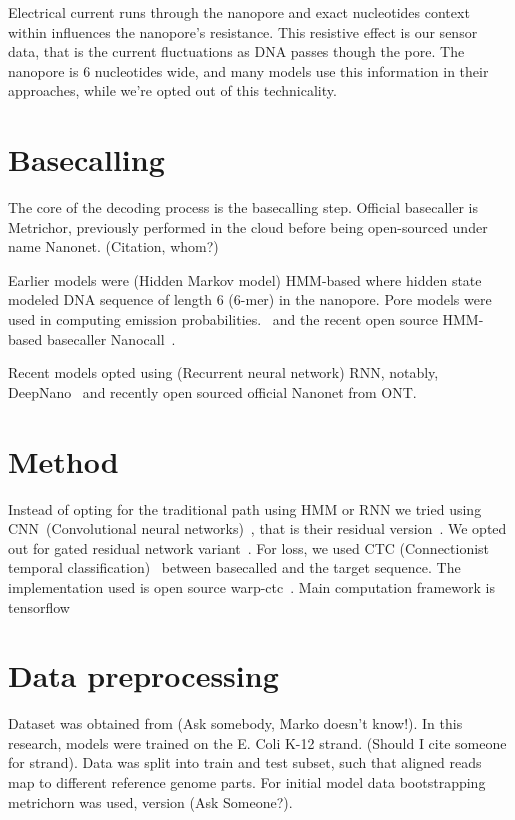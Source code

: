 \documentclass[runningheads,a4paper]{llncs}
\begin{document}
Electrical current runs through the nanopore and exact nucleotides context within influences the nanopore's resistance. This resistive effect is our sensor data, that is the current fluctuations as DNA passes though the pore. The nanopore is 6 nucleotides wide, and many models use this information in their approaches, while we're opted out of this technicality.

\section{Basecalling}

The core of the decoding process is the basecalling step. Official basecaller is Metrichor, previously performed in the cloud before being open-sourced under name Nanonet. (Citation, whom?)

Earlier models were (Hidden Markov model) HMM-based where hidden state modeled DNA sequence of length 6 (6-mer) in the nanopore. Pore models were used in computing emission probabilities.~\cite{loman2015complete,schreiber2015analysis,szalay2015novo,timp2012dna} and the recent open source HMM-based basecaller Nanocall~\cite{david2016nanocall}.

Recent models opted using (Recurrent neural network) RNN, notably, DeepNano~\cite{deepnano} and recently open sourced official Nanonet from ONT.

\section{Method}

Instead of opting for the traditional path using HMM or RNN we tried using CNN~(Convolutional neural networks)~\cite{lecun-98}, that is their residual version~\cite{he2016deep}. We opted out for gated residual network variant~\cite{savarese2016learning}. For loss, we used CTC (Connectionist temporal classification)~\cite{graves2006connectionist} between basecalled and the target sequence. The implementation used is open source warp-ctc~\cite{warpctc}. Main computation framework is tensorflow~\cite{tensorflow2015-whitepaper}

\section{Data preprocessing}

Dataset was obtained from (Ask somebody, Marko doesn't know!). In this research, models were trained on the E. Coli K-12 strand. (Should I cite someone for strand). Data was split into train and test subset, such that aligned reads map to different reference genome parts. For initial model data bootstrapping metrichorn was used, version (Ask Someone?).
\end{document}
